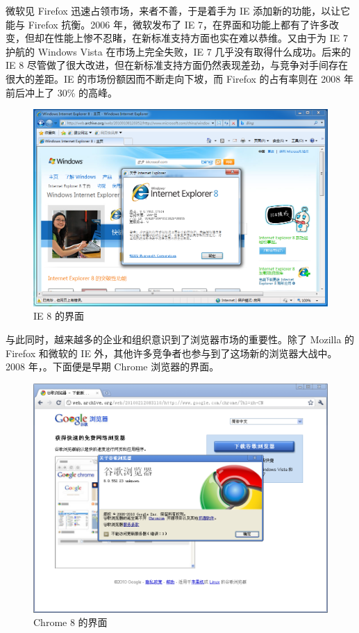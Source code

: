 微软见 Firefox 迅速占领市场，来者不善，于是着手为 IE 添加新的功能，以让它能与 Firefox 抗衡。2006 年，微软发布了 IE 7，在界面和功能上都有了许多改变，但却在性能上惨不忍睹，在新标准支持方面也实在难以恭维。又由于为 IE 7 护航的 Windows Vista 在市场上完全失败，IE 7 几乎没有取得什么成功。后来的 IE 8 尽管做了很大改进，但在新标准支持方面仍然表现差劲，与竞争对手间存在很大的差距。IE 的市场份额因而不断走向下坡，而 Firefox 的占有率则在 2008 年前后冲上了 30\% 的高峰。

\begin{figure}[htb!]
  \centering
  \includegraphics[width=.6\textwidth]{assets/software/IE8.png}
  \caption{IE 8 的界面}
  \label{fig:IE8}
\end{figure}

与此同时，越来越多的企业和组织意识到了浏览器市场的重要性。除了 Mozilla 的 Firefox 和微软的 IE 外，其他许多竞争者也参与到了这场新的浏览器大战中。2008 年，。下面便是早期 Chrome 浏览器的界面。

\begin{figure}[htb!]
  \centering
  \includegraphics[width=.7\textwidth]{assets/software/Chrome_8.png}
  \caption{Chrome 8 的界面}
  \label{fig:Chrome_8}
\end{figure}

